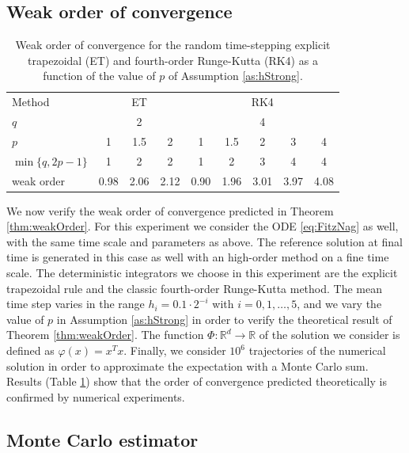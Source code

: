 \documentclass{siamart1116}
\numberwithin{theorem}{section}
\renewcommand{\phi}{\varphi}
\newcommand{\R}{\mathbb{R}}
\begin{document}
\subsection{Weak order of convergence}

\begin{table}[t]
	\centering
	\begin{tabular}{lcccccccc}
		\toprule
		Method & \multicolumn{3}{c}{ET} & \multicolumn{5}{c}{RK4} \\ 
		\cmidrule(l{2pt}r{2pt}){2-4} \cmidrule(l{2pt}r{2pt}){5-9} 
		$q$ & \multicolumn{3}{c}{2} & \multicolumn{5}{c}{4} \\
		$p$ & 1 & 1.5 & 2 & 1 & 1.5 & 2 & 3 & 4\\
		$\min\{q, 2p - 1\}$ & 1 & 2 & 2 & 1 & 2 & 3 & 4 & 4 \\
		weak order & 0.98 & 2.06 & 2.12 & 0.90 & 1.96 & 3.01 & 3.97 & 4.08 \\
		\bottomrule
	\end{tabular}
	\caption{Weak order of convergence for the random time-stepping explicit trapezoidal (ET) and fourth-order Runge-Kutta (RK4) as a function of the value of $p$ of Assumption \ref{as:hStrong}.}
	\label{tab:NumericalResultsWeakOrder}
\end{table}

We now verify the weak order of convergence predicted in Theorem \ref{thm:weakOrder}. For this experiment we consider the ODE \eqref{eq:FitzNag} as well, with the same time scale and parameters as above. The reference solution at final time is generated in this case as well with an high-order method on a fine time scale. The deterministic integrators we choose in this experiment are the explicit trapezoidal rule and the classic fourth-order Runge-Kutta method. The mean time step varies in the range $h_i = 0.1\cdot 2^{-i}$ with $i = 0, 1, \ldots, 5$, and we vary the value of $p$ in Assumption \ref{as:hStrong} in order to verify the theoretical result of Theorem \ref{thm:weakOrder}. The function $\Phi\colon\R^d\to\R$ of the solution we consider is defined as $\phi(x) = x^Tx$. Finally, we consider $10^6$ trajectories of the numerical solution in order to approximate the expectation with a Monte Carlo sum. Results (Table \ref{tab:NumericalResultsWeakOrder}) show that the order of convergence predicted theoretically is confirmed by numerical experiments. 

\subsection{Monte Carlo estimator}
\end{document}
